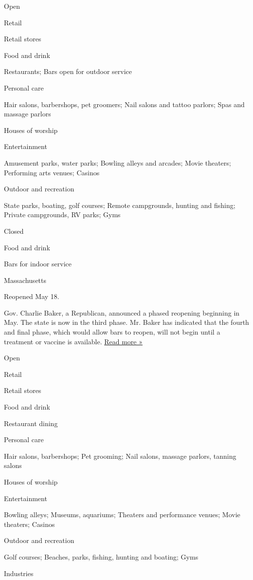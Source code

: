 Open

Retail

Retail stores

Food and drink

Restaurants; Bars open for outdoor service

Personal care

Hair salons, barbershops, pet groomers; Nail salons and tattoo parlors;
Spas and massage parlors

Houses of worship

Entertainment

Amusement parks, water parks; Bowling alleys and arcades; Movie
theaters; Performing arts venues; Casinos

Outdoor and recreation

State parks, boating, golf courses; Remote campgrounds, hunting and
fishing; Private campgrounds, RV parks; Gyms

Closed

Food and drink

Bars for indoor service

Massachusetts

Reopened May 18.

Gov. Charlie Baker, a Republican, announced a phased reopening beginning
in May. The state is now in the third phase. Mr. Baker has indicated
that the fourth and final phase, which would allow bars to reopen, will
not begin until a treatment or vaccine is available.
\href{https://www.nbcboston.com/news/coronavirus/for-phase-4-businesses-indefinite-wait-to-reopen-is-exceptionally-difficult/2159533/}{Read
more »}

Open

Retail

Retail stores

Food and drink

Restaurant dining

Personal care

Hair salons, barbershops; Pet grooming; Nail salons, massage parlors,
tanning salons

Houses of worship

Entertainment

Bowling alleys; Museums, aquariums; Theaters and performance venues;
Movie theaters; Casinos

Outdoor and recreation

Golf courses; Beaches, parks, fishing, hunting and boating; Gyms

Industries

